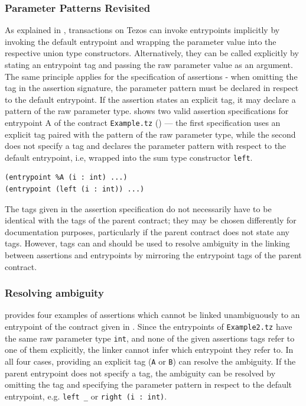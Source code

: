 \subsubsection{Parameter Patterns Revisited}
As explained in , transactions on Tezos can invoke entrypoints implicitly by invoking the default entrypoint and wrapping the parameter value into the respective union type constructors. Alternatively, they can be called explicitly by stating an entrypoint tag and passing the raw parameter value as an argument. The same principle applies for the specification of assertions - when omitting the tag in the assertion signature, the parameter pattern must be declared in respect to the default entrypoint. If the assertion states an explicit tag, it may declare a pattern of the raw parameter type.  shows two valid assertion specifications for entrypoint A of the contract \texttt{Example.tz} () --- the first specification uses an explicit tag paired with the pattern of the raw parameter type, while the second does not specify a tag and declares the parameter pattern with respect to the default entrypoint, i.e, wrapped into the sum type constructor \texttt{left}. 
\begin{lstlisting}[language=Assertion, numbers=none, caption=Explicit and implicit parameter specification in assertions, label=lst:impl_expl]
(entrypoint %A (i : int) ...)
(entrypoint (left (i : int)) ...)
\end{lstlisting}

The tags given in the assertion specification do not necessarily have to be identical with the tags of the parent contract; they may be chosen differently for documentation purposes, particularly if the parent contract does not state any tags. However, tags can and should be used to resolve ambiguity in the linking between assertions and entrypoints by mirroring the entrypoint tags of the parent contract.

\subsubsection{Resolving ambiguity}
 provides four examples of assertions which cannot be linked unambiguously to an entrypoint of the contract given in . Since the entrypoints of \texttt{Example2.tz} have the same raw parameter type \texttt{int}, and none of the given assertions tags refer to one of them explicitly, the linker cannot infer which entrypoint they refer to. In all four cases, providing an explicit tag (\texttt{A} or \texttt{B}) can resolve the ambiguity. If the parent entrypoint does not specify a tag, the ambiguity can be resolved by omitting the tag and specifying the parameter pattern in respect to the default entrypoint, e.g. \texttt{left \_} or \texttt{right (i : int)}. 

